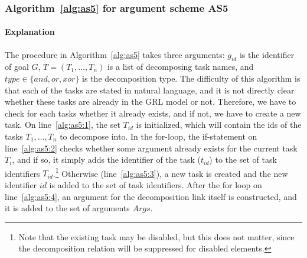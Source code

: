 \subsubsection{Algorithm~\ref{alg:as5} for argument scheme AS5}

\paragraph{Explanation} The procedure in Algorithm~\ref{alg:as5} takes three arguments: $g_{id}$ is the identifier of goal $G$, $T=(T_1,\ldots,T_n)$ is a list of decomposing task names, and $type\in\{and,or,xor\}$ is the decomposition type. The difficulty of this algorithm is that each of the tasks are stated in natural language, and it is not directly clear whether these tasks are already in the GRL model or not. Therefore, we have to check for each tasks whether it already exists, and if not, we have to create a new task. On line~\ref{alg:as5:1}, the set $T_{id}$ is initialized, which will contain the ids of the tasks $T_1,\ldots,T_n$ to decompose into. In the for-loop, the if-statement on line~\ref{alg:as5:2} checks whether some argument already exists for the current task $T_i$, and if so, it simply adds the identifier of the task ($t_{id}$) to the set of task identifiers $T_{id}$.\footnote{Note that the existing task may be disabled, but this does not matter, since the decomposition relation will be suppressed for disabled elements.} Otherwise (line~\ref{alg:as5:3}), a new task is created and the new identifier $id$ is added to the set of task identifiers. After the for loop on line~\ref{alg:as5:4}, an argument for the decomposition link itself is constructed, and it is added to the set of arguments $Args$.

